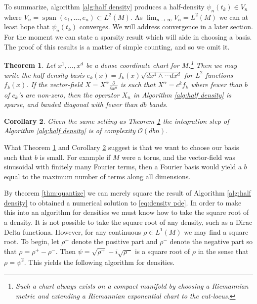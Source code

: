 \documentclass[12pt]{amsart}
\newcommand{\pder}[2]{\ensuremath{\frac{ \partial #1}{\partial #2}}}
\newtheorem{thm}{Theorem}[section]
\newtheorem{cor}[thm]{Corollary}
\begin{document}
To summarize, algorithm \ref{alg:half density} produces a half-density $\psi_{n}(t_{k}) \in V_{n}$ where $V_{n} = \operatorname{span}( e_{1},\dots,e_{n}) \subset L^{2}(M)$.
As $\lim_{n\to \infty} V_{n} = L^{2}(M)$ we can at least hope that $\psi_{n}(t_{k})$ converges.
We will address convergence in a later section.
For the moment we can state a sparsity result which will aide in choosing a basis.
The proof of this results is a matter of simple counting, and so we omit it.

\begin{thm} \label{thm:sparsity}
	Let $x^{1},\dots,x^{d}$ be a dense coordinate chart for $M$.\footnote{Such a chart always exists on a compact manifold by choosing a Riemannian metric and extending a Riemannian exponential chart to the cut-locus.\cite{Sakai1996,MO_dense_charts} }
	Then we may write the half density basis $e_{k} (x)= f_{k}(x) \sqrt{dx^{1} \wedge \cdots dx^{d}}$ for $L^{2}$-functions $f_{k}(x)$.
	If the vector-field $X = X^{\alpha} \pder{}{x^{\alpha}}$ is such that $X^{\alpha} = c^{k} f_{k}$ where fewer than $b$ of $c_{k}$'s are non-zero, then
	the operator $X_{n}$ in Algorithm \ref{alg:half density} is sparse, and banded diagonal with fewer than $db$ bands.
\end{thm}

\begin{cor} \label{cor:sparsity}
	Given the same setting as Theorem \ref{thm:sparsity} the integration step of Algorithm \ref{alg:half density} is of complexity $\mathcal{O}( dbn)$.
\end{cor}

What Theorem \ref{thm:sparsity} and Corollary \ref{cor:sparsity} suggest is that we want to choose our basis such that $b$ is small.
For example if $M$ were a torus, and the vector-field was sinusoidal with finitely many Fourier terms, then a Fourier basis would yield a $b$ equal to the maximum number of terms along all dimensions.

By theorem \ref{thm:quantize} we can merely square the result of Algorithm \ref{alg:half density} to obtained a numerical solution to \eqref{eq:density pde}.
In order to make this into an algorithm for densities we must know how to take the square root of a density.
It is not possible to take the square root of any density, such as a Dirac Delta functiona.
However, for any continuous $\rho \in L^{1}(M)$ we may find a square root.
To begin, let $\rho^{+}$ denote the positive part and $\rho^{-}$ denote the negative part so that $\rho = \rho^{+} - \rho^{-}$.
Then $\psi = \sqrt{\rho^{+}} - i \sqrt{\rho^{-}}$ is a square root of $\rho$ in the sense that $\rho = \psi^{2}$.
This yields the following algorithm for densities.
\end{document}
